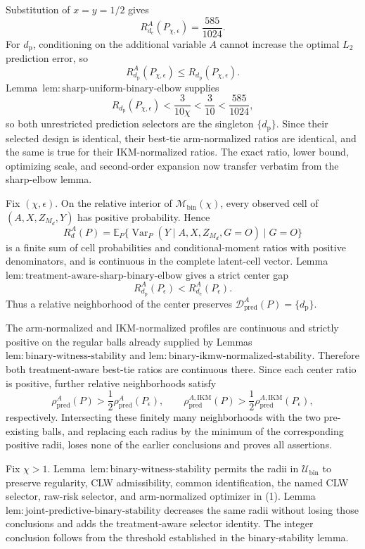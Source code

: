 Substitution of \(x=y=1/2\) gives
\[
 R_{d_{\mathrm e}}^A(P_{\chi,\epsilon})=\frac{585}{1024}.
\]
For \(d_{\mathrm p}\), conditioning on the additional variable \(A\) cannot increase the optimal \(L_2\) prediction error, so
\[
 R_{d_{\mathrm p}}^A(P_{\chi,\epsilon})
 \le R_{d_{\mathrm p}}(P_{\chi,\epsilon}).
\]
Lemma~\(\mathrm{lem{:}sharp\text{-}uniform\text{-}binary\text{-}elbow}\) supplies
\[
 R_{d_{\mathrm p}}(P_{\chi,\epsilon})
 <\frac3{10\chi}<\frac3{10}<\frac{585}{1024},
\]
so both unrestricted prediction selectors are the singleton \(\{d_{\mathrm p}\}\).  Since their selected design is identical, their best-tie arm-normalized ratios are identical, and the same is true for their IKM-normalized ratios.  The exact ratio, lower bound, optimizing scale, and second-order expansion now transfer verbatim from the sharp-elbow lemma.

Fix \((\chi,\epsilon)\).  On the relative interior of \(\mathcal M_{\mathrm{bin}}(\chi)\), every observed cell of \((A,X,Z_{M_d},Y)\) has positive probability.  Hence
\[
 R_d^A(P)=
 \mathbb E_P\{\operatorname{Var}_P(Y\mid A,X,Z_{M_d},G=O)\mid G=O\}
\]
is a finite sum of cell probabilities and conditional-moment ratios with positive denominators, and is continuous in the complete latent-cell vector.  Lemma~\(\mathrm{lem{:}treatment\text{-}aware\text{-}sharp\text{-}binary\text{-}elbow}\) gives a strict center gap
\[
 R_{d_{\mathrm p}}^A(P_\epsilon)<R_{d_{\mathrm e}}^A(P_\epsilon).
\]
Thus a relative neighborhood of the center preserves \(\mathcal D_{\mathrm{pred}}^A(P)=\{d_{\mathrm p}\}\).

The arm-normalized and IKM-normalized profiles are continuous and strictly positive on the regular balls already supplied by Lemmas~\(\mathrm{lem{:}binary\text{-}witness\text{-}stability}\) and \(\mathrm{lem{:}binary\text{-}ikmw\text{-}normalized\text{-}stability}\).  Therefore both treatment-aware best-tie ratios are continuous there.  Since each center ratio is positive, further relative neighborhoods satisfy
\[
 \rho_{\mathrm{pred}}^A(P)
 >\frac12\rho_{\mathrm{pred}}^A(P_\epsilon),
 \qquad
 \rho_{\mathrm{pred}}^{A,\mathrm{IKM}}(P)
 >\frac12\rho_{\mathrm{pred}}^{A,\mathrm{IKM}}(P_\epsilon),
\]
respectively.  Intersecting these finitely many neighborhoods with the two pre-existing balls, and replacing each radius by the minimum of the corresponding positive radii, loses none of the earlier conclusions and proves all assertions.

Fix \(\chi>1\).  Lemma~\(\mathrm{lem{:}binary\text{-}witness\text{-}stability}\) permits the radii in \(\mathcal U_{\mathrm{bin}}\) to preserve regularity, CLW admissibility, common identification, the named CLW selector, raw-risk selector, and arm-normalized optimizer in (1).  Lemma~\(\mathrm{lem{:}joint\text{-}predictive\text{-}binary\text{-}stability}\) decreases the same radii without losing those conclusions and adds the treatment-aware selector identity.  The integer conclusion follows from the threshold established in the binary-stability lemma.

